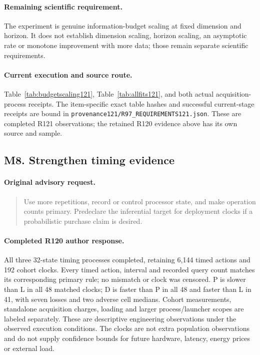 \paragraph{Remaining scientific requirement.}
The experiment is genuine information-budget scaling at fixed dimension and horizon. It does not establish dimension scaling, horizon scaling, an asymptotic rate or monotone improvement with more data; those remain separate scientific requirements.

\paragraph{Current execution and source route.}
Table~\ref{tab:budgetscaling121}, Table~\ref{tab:allfits121}, and both actual acquisition-process receipts.
The item-specific exact table hashes and successful current-stage receipts are bound in \nolinkurl{provenance121/R97_REQUIREMENTS121.json}. These are completed R121 observations; the retained R120 evidence above has its own source and sample.

\subsection{M8. Strengthen timing evidence}
\label{response121:M8}

\paragraph{Original advisory request.}
\begin{quote}
Use more repetitions, record or control processor state, and make operation counts primary. Predeclare the inferential target for deployment clocks if a probabilistic purchase claim is desired.
\end{quote}

\paragraph{Completed R120 author response.}
All three 32-state timing processes completed, retaining 6,144 timed actions and 192 cohort clocks. Every timed action, interval and recorded query count matches its corresponding primary rule; no mismatch or clock was censored. P is slower than L in all 48 matched clocks; D is faster than P in all 48 and faster than L in 41, with seven losses and two adverse cell medians. Cohort measurements, standalone acquisition charges, loading and larger process/launcher scopes are labeled separately. These are descriptive engineering observations under the observed execution conditions. The clocks are not extra population observations and do not supply confidence bounds for future hardware, latency, energy prices or external load.

